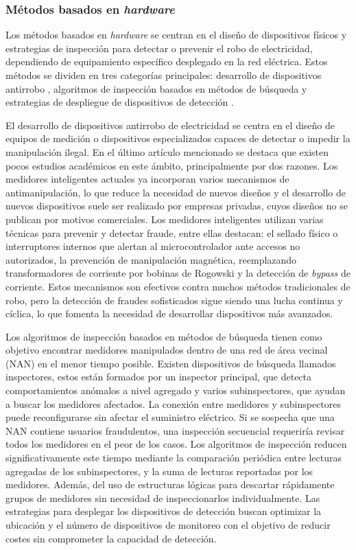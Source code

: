 \documentclass[12pt,a4paper]{report}
\begin{document}
\subsubsection{Métodos basados en \emph{hardware}}

Los métodos basados en \emph{hardware} se centran en el diseño de dispositivos físicos y estrategias de inspección para detectar o prevenir el robo de electricidad, dependiendo de equipamiento específico desplegado en la red eléctrica. Estos métodos se dividen en tres categorías principales: desarrollo de dispositivos antirrobo \cite{articulo1}, algoritmos de inspección basados en métodos de búsqueda \cite{articulo1} y estrategias de despliegue de dispositivos de detección \cite{articulo1}.

El desarrollo de dispositivos antirrobo de electricidad se centra en el diseño de equipos de medición o dispositivos especializados capaces de detectar o impedir la manipulación ilegal. En el último artículo mencionado se destaca que existen pocos estudios académicos en este ámbito, principalmente por dos razones. Los medidores inteligentes actuales ya incorporan varios mecanismos de antimanipulación, lo que reduce la necesidad de nuevos diseños y el desarrollo de nuevos dispositivos suele ser realizado por empresas privadas, cuyos diseños no se publican por motivos comerciales. Los medidores inteligentes utilizan varias técnicas para prevenir y detectar fraude, entre ellas destacan: el sellado físico o interruptores internos que alertan al microcontrolador ante accesos no autorizados, la prevención de manipulación magnética, reemplazando transformadores de corriente por bobinas de Rogowski y la detección de \emph{bypass} de corriente. Estos mecanismos son efectivos contra muchos métodos tradicionales de robo, pero la detección de fraudes sofisticados sigue siendo una lucha continua y cíclica, lo que fomenta la necesidad de desarrollar dispositivos más avanzados.

Los algoritmos de inspección basados en métodos de búsqueda tienen como objetivo encontrar medidores manipulados dentro de una red de área vecinal (NAN) en el menor tiempo posible. Existen dispositivos de búsqueda llamados inspectores, estos están formados por un inspector principal, que detecta comportamientos anómalos a nivel agregado y varios subinspectores, que ayudan a buscar los medidores afectados. La conexión entre medidores y subinspectores puede reconfigurarse sin afectar el suministro eléctrico. Si se sospecha que una NAN contiene usuarios fraudulentos, una inspección secuencial requeriría revisar todos los medidores en el peor de los casos. Los algoritmos de inspección reducen significativamente este tiempo mediante la comparación periódica entre lecturas agregadas de los subinspectores, y la suma de lecturas reportadas por los medidores. Además, del uso de estructuras lógicas para descartar rápidamente grupos de medidores sin necesidad de inspeccionarlos individualmente. Las estrategias para desplegar los dispositivos de detección buscan optimizar la ubicación y el número de dispositivos de monitoreo con el objetivo de reducir costes sin comprometer la capacidad de detección.
\end{document}
